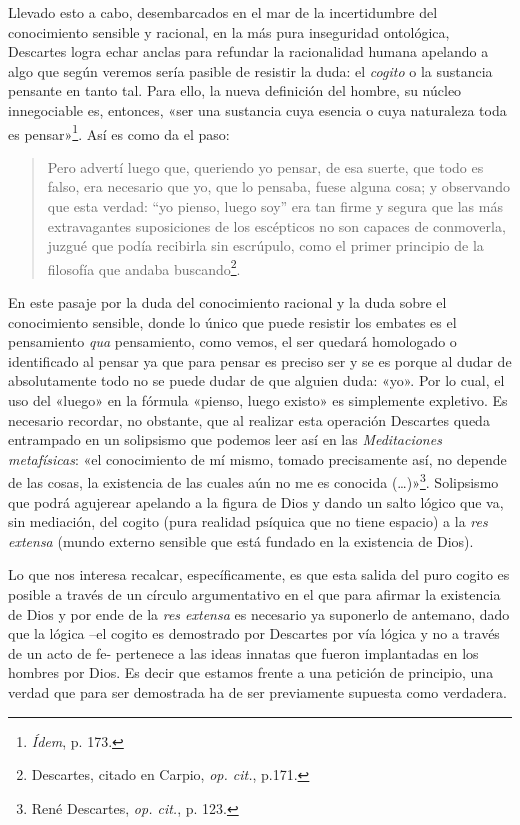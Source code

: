 Llevado esto a cabo, desembarcados en el mar de la incertidumbre del conocimiento sensible y racional, en la más pura inseguridad ontológica, Descartes logra echar anclas para refundar la racionalidad humana apelando a algo que según veremos sería pasible de resistir la duda: el \emph{cogito} o la sustancia pensante en tanto tal. Para ello, la nueva definición del hombre, su núcleo innegociable es, entonces, «ser una sustancia cuya esencia o cuya naturaleza toda es pensar»\footnote{\emph{Ídem}, p. 173.}. Así es como da el paso:

\begin{quote}
Pero advertí luego que, queriendo yo pensar, de esa suerte, que todo es falso, era necesario que yo, que lo pensaba, fuese alguna cosa; y observando que esta verdad: ``yo pienso, luego soy'' era tan firme y segura que las más extravagantes suposiciones de los escépticos no son capaces de conmoverla, juzgué que podía recibirla sin escrúpulo, como el primer principio de la filosofía que andaba buscando\footnote{Descartes, citado en Carpio, \emph{op. cit.}, p.171.}.
\end{quote}

En este pasaje por la duda del conocimiento racional y la duda sobre el conocimiento sensible, donde lo único que puede resistir los embates es el pensamiento \emph{qua} pensamiento, como vemos, el ser quedará homologado o identificado al pensar ya que para pensar es preciso ser y se es porque al dudar de absolutamente todo no se puede dudar de que alguien duda: «yo». Por lo cual, el uso del «luego» en la fórmula «pienso, luego existo» es simplemente expletivo. Es necesario recordar, no obstante, que al realizar esta operación Descartes queda entrampado en un solipsismo que podemos leer así en las \emph{Meditaciones metafísicas}: «el conocimiento de mí mismo, tomado precisamente así, no depende de las cosas, la existencia de las cuales aún no me es conocida (\ldots)»\footnote{René Descartes, \emph{op. cit.}, p. 123.}. Solipsismo que podrá agujerear apelando a la figura de Dios y dando un salto lógico que va, sin mediación, del cogito (pura realidad psíquica que no tiene espacio) a la \emph{res extensa} (mundo externo sensible que está fundado en la existencia de Dios).

Lo que nos interesa recalcar, específicamente, es que esta salida del puro cogito es posible a través de un círculo argumentativo en el que para afirmar la existencia de Dios y por ende de la \emph{res extensa} es necesario ya suponerlo de antemano, dado que la lógica --el cogito es demostrado por Descartes por vía lógica y no a través de un acto de fe- pertenece a las ideas innatas que fueron implantadas en los hombres por Dios. Es decir que estamos frente a una petición de principio, una verdad que para ser demostrada ha de ser previamente supuesta como verdadera.

